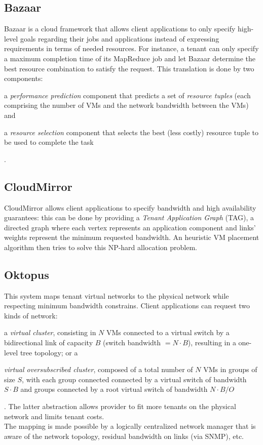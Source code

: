 \documentclass[a4paper, 11pt]{article}
\begin{document}
\subsection{Bazaar \cite{bazaar}}
Bazaar \cite{bazaar} is a cloud framework that allows client applications to only specify high-level goals regarding their jobs and applications instead of expressing requirements in terms of needed resources. For instance, a tenant can only specify a maximum completion time of its MapReduce \cite{mapreduce} job and let Bazaar \cite{bazaar} determine the best resource combination to satisfy the request. This translation is done by two components:
\begin{mylist}
    \item a \textit{performance prediction} component that predicts a set of \textit{resource tuples} (each comprising the number of VMs and the network bandwidth between the VMs) and
    \item a \textit{resource selection} component that selects the best (less costly) resource tuple to be used to complete the task
\end{mylist}.\\
\subsection{CloudMirror \cite{cloudmirror}}
CloudMirror \cite{cloudmirror} allows client applications to specify bandwidth and high availability guarantees: this can be done by providing a \textit{Tenant Application Graph} (TAG), a directed graph where each vertex represents an application component and links' weights represent the minimum requested bandwidth. An heuristic VM placement algorithm then tries to solve this NP-hard allocation problem.
\subsection{Oktopus \cite{oktopus}}
This system maps tenant virtual networks to the physical network while respecting minimum bandwidth constrains. Client applications can request two kinds of network:
\begin{mylist}
    \item a \textit{virtual cluster}, consisting in $N$ VMs connected to a virtual switch by a bidirectional link of capacity $B$ (switch bandwidth $= N \cdot B$), resulting in a one-level tree topology; or a
    \item \textit{virtual oversubscribed cluster}, composed of a total number of $N$ VMs in groups of size $S$, with each group connected connected by a virtual switch of bandwidth $S \cdot B$ and groups connected by a root virtual switch of bandwidth $N \cdot B / O$
\end{mylist}.
The latter abstraction allows provider to fit more tenants on the physical network and limits tenant costs.\\
The mapping is made possible by a logically centralized network manager that is aware of the network topology, residual bandwidth on links (via SNMP), etc.



\end{document}
